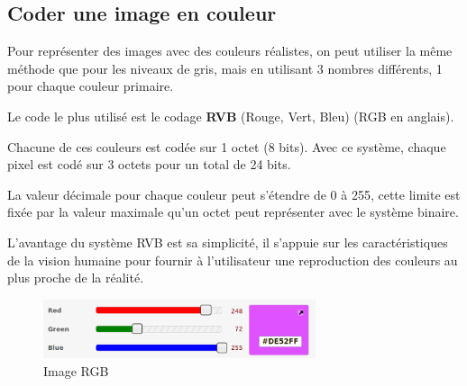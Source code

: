 \documentclass[11pt, a4paper]{book}
\begin{document}
\subsection{Coder une image en couleur}

Pour représenter des images avec des couleurs réalistes, on peut utiliser la même méthode que pour les niveaux de gris, mais en utilisant 3 nombres différents, 1 pour chaque couleur primaire.

Le code le plus utilisé est le codage {\bf RVB} (Rouge, Vert, Bleu) (RGB en anglais). 

Chacune de ces couleurs est codée sur 1 octet (8 bits). 
Avec ce système, chaque pixel est codé sur 3 octets pour un total de 24 bits. 

La valeur décimale pour chaque couleur peut s’étendre de 0 à 255, cette limite est fixée par la valeur maximale qu’un octet peut représenter avec le système binaire.

L’avantage du système RVB est sa simplicité, 
il s’appuie sur les caractéristiques de la vision humaine pour fournir à l’utilisateur une reproduction des couleurs au plus proche de la réalité.


\begin{center}
\begin{figure}[H]
\centering
\includegraphics[width=8cm]{images/RGB}
\caption{Image RGB}
\end{figure}
\end{center}
\end{document}
